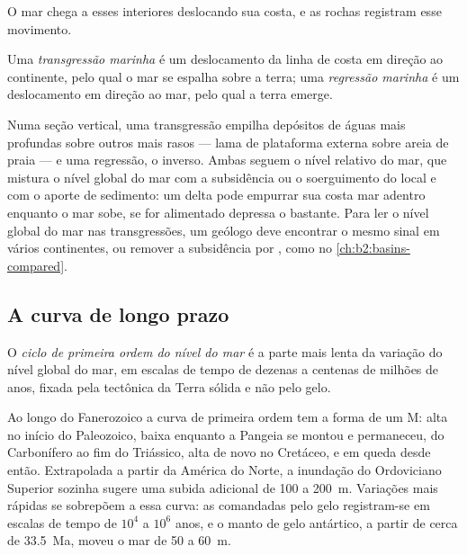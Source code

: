 O mar chega a esses interiores deslocando sua costa, e as rochas registram esse movimento.

\begin{definition}\label{def:b2:phanerozoic-earth:transgression}
Uma \emph{transgressão marinha} é um deslocamento da linha de costa em direção ao continente,
pelo qual o mar se espalha sobre a terra; uma \emph{regressão marinha} é
um deslocamento em direção ao mar, pelo qual a terra emerge.
\end{definition}

Numa seção vertical, uma transgressão empilha depósitos de águas mais profundas sobre outros mais rasos ---
lama de plataforma externa sobre areia de praia --- e uma regressão, o inverso. Ambas seguem o nível relativo do
mar, que mistura o nível global do mar com a subsidência ou o soerguimento do local e com o
aporte de sedimento: um delta pode empurrar sua costa mar adentro enquanto o mar sobe, se for alimentado depressa
o bastante. Para ler o nível global do mar nas transgressões, um geólogo deve encontrar o mesmo sinal
em vários continentes, ou remover a subsidência por , como no
\cref{ch:b2:basins-compared}.

\subsection*{A curva de longo prazo}

\begin{definition}\label{def:b2:phanerozoic-earth:first-order}
O \emph{ciclo de primeira ordem do nível do mar} é a parte mais lenta
da variação do nível global do mar, em escalas de tempo de dezenas a centenas de milhões de anos, fixada pela
tectônica da Terra sólida e não pelo gelo.
\end{definition}

Ao longo do Fanerozoico a curva de primeira ordem tem a forma de um M: alta no início do Paleozoico,
baixa enquanto a Pangeia se montou e permaneceu, do Carbonífero ao fim do Triássico, alta
de novo no Cretáceo, e em queda desde então. Extrapolada a partir da América do Norte, a inundação do Ordoviciano
Superior sozinha sugere uma subida adicional de 100 a \qty{200}{m}.
Variações mais rápidas se sobrepõem a essa curva: as comandadas pelo gelo registram-se em escalas de tempo de $10^4$ a
$10^6$ anos, e o manto de gelo antártico, a partir de cerca de \qty{33.5}{Ma}, moveu o mar de 50 a
\qty{60}{m}.

